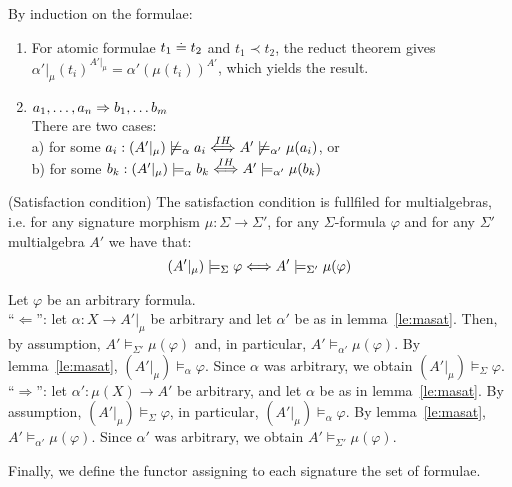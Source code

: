 \documentclass[10pt]{article}
\begin{document}
\begin{PROOF}
By induction on the formulae:
\begin{enumerate}
 
\item For atomic formulae $t_1 \mathrel{\dot{=} }  t_2$ and $t_1\prec t_2$, the reduct theorem
gives $\alpha'|_\mu(t_i)^{A'|_{\mu}}=\alpha'(\mu(t_i))^{A'}$, which yields
the result.

\item $a_1, \ldots ,a_n \Rightarrow b_1, \ldots b_m$ \label{it:conditional}\\
There are two cases:\\
a) for some $a_i: (A' |_\mu) \not\models_\alpha a_i \stackrel{IH}{\Longleftrightarrow}
A' \not\models_{\alpha'} \mu(a_i)$, or\\
b) for some $b_k: (A' |_\mu) \models_\alpha b_k
  \stackrel{IH}{\Longleftrightarrow} A' \models_{\alpha'} \mu(b_k)$
\end{enumerate}
\end{PROOF}
%
\begin{fact}\label{th:masat}(Satisfaction condition)
The satisfaction condition is fullfiled for multialgebras, i.e. for any
signature morphism $\mu: \Sigma \to \Sigma'$, for any $\Sigma$-formula
$\varphi$ and for any $\Sigma'$ multialgebra $A'$ we have that:
\[ (A' |_\mu) \models_\Sigma \varphi \Longleftrightarrow A' \models_{\Sigma'} \mu(\varphi) \]
\end{fact}
\begin{PROOF} 
Let $\varphi$ be an arbitrary formula.\\
``$\Leftarrow$'': let $\alpha:X \to A'|_\mu$ be arbitrary and let $\alpha'$
 be as in lemma~\ref{le:masat}. Then, by assumption, $A' \models_{\Sigma'}
 \mu(\varphi)$ and, in particular, $A' \models_{\alpha'} \mu(\varphi)$. By
 lemma~\ref{le:masat}, $(A' |_\mu) \models_\alpha \varphi$. Since $\alpha$
 was arbitrary, we obtain $(A' |_\mu) \models_\Sigma \varphi$.\\
``$\Rightarrow$'': let $\alpha':\mu(X) \to A'$ be arbitrary, and let $\alpha$
 be as in lemma~\ref{le:masat}. By assumption, $(A' |_\mu) \models_\Sigma
 \varphi$, in particular, $(A' |_\mu) \models_\alpha \varphi$. By
 lemma~\ref{le:masat}, $A' \models_{\alpha'} \mu(\varphi)$. Since $\alpha'$
 was arbitrary, we obtain $A' \models_{\Sigma'} \mu(\varphi)$.
\end{PROOF}
%
Finally, we define the functor assigning to each signature the set of formulae.
\end{document}
